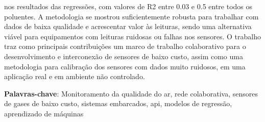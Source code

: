 \begin{resumo}
nos resultados das regressões, com valores de R2 entre 0.03 e 0.5 entre todos os poluentes. A metodologia se mostrou suficientemente robusta para trabalhar com dados de baixa qualidade e acrescentar valor às leituras, sendo uma alternativa viável para equipamentos com leituras ruidosas ou falhas nos sensores. O trabalho traz como principais contribuições um marco de trabalho colaborativo para o desenvolvimento e interconexão de sensores de baixo custo, assim como uma metodologia para calibração dos sensores com dados muito ruidosos, em uma aplicação real e em ambiente não controlado.
	
	\textbf{Palavras-chave}: Monitoramento da qualidade do ar, rede colaborativa, sensores de gases de baixo custo, sistemas embarcados, \acrshort{api}, modelos de regressão, aprendizado de máquinas
\end{resumo}

